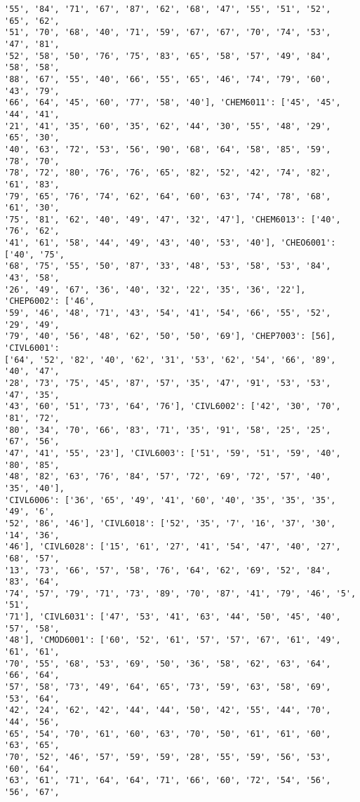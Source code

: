 \documentclass[11pt]{article}
\begin{document}
\begin{Verbatim}[commandchars=\\\{\}]
'55', '84', '71', '67', '87', '62', '68', '47', '55', '51', '52', '65', '62',
'51', '70', '68', '40', '71', '59', '67', '67', '70', '74', '53', '47', '81',
'52', '58', '50', '76', '75', '83', '65', '58', '57', '49', '84', '58', '58',
'88', '67', '55', '40', '66', '55', '65', '46', '74', '79', '60', '43', '79',
'66', '64', '45', '60', '77', '58', '40'], 'CHEM6011': ['45', '45', '44', '41',
'21', '41', '35', '60', '35', '62', '44', '30', '55', '48', '29', '65', '30',
'40', '63', '72', '53', '56', '90', '68', '64', '58', '85', '59', '78', '70',
'78', '72', '80', '76', '76', '65', '82', '52', '42', '74', '82', '61', '83',
'79', '65', '76', '74', '62', '64', '60', '63', '74', '78', '68', '61', '30',
'75', '81', '62', '40', '49', '47', '32', '47'], 'CHEM6013': ['40', '76', '62',
'41', '61', '58', '44', '49', '43', '40', '53', '40'], 'CHEO6001': ['40', '75',
'68', '75', '55', '50', '87', '33', '48', '53', '58', '53', '84', '43', '58',
'26', '49', '67', '36', '40', '32', '22', '35', '36', '22'], 'CHEP6002': ['46',
'59', '46', '48', '71', '43', '54', '41', '54', '66', '55', '52', '29', '49',
'79', '40', '56', '48', '62', '50', '50', '69'], 'CHEP7003': [56], 'CIVL6001':
['64', '52', '82', '40', '62', '31', '53', '62', '54', '66', '89', '40', '47',
'28', '73', '75', '45', '87', '57', '35', '47', '91', '53', '53', '47', '35',
'43', '60', '51', '73', '64', '76'], 'CIVL6002': ['42', '30', '70', '81', '72',
'80', '34', '70', '66', '83', '71', '35', '91', '58', '25', '25', '67', '56',
'47', '41', '55', '23'], 'CIVL6003': ['51', '59', '51', '59', '40', '80', '85',
'48', '82', '63', '76', '84', '57', '72', '69', '72', '57', '40', '35', '40'],
'CIVL6006': ['36', '65', '49', '41', '60', '40', '35', '35', '35', '49', '6',
'52', '86', '46'], 'CIVL6018': ['52', '35', '7', '16', '37', '30', '14', '36',
'46'], 'CIVL6028': ['15', '61', '27', '41', '54', '47', '40', '27', '68', '57',
'13', '73', '66', '57', '58', '76', '64', '62', '69', '52', '84', '83', '64',
'74', '57', '79', '71', '73', '89', '70', '87', '41', '79', '46', '5', '51',
'71'], 'CIVL6031': ['47', '53', '41', '63', '44', '50', '45', '40', '57', '58',
'48'], 'CMOD6001': ['60', '52', '61', '57', '57', '67', '61', '49', '61', '61',
'70', '55', '68', '53', '69', '50', '36', '58', '62', '63', '64', '66', '64',
'57', '58', '73', '49', '64', '65', '73', '59', '63', '58', '69', '53', '64',
'42', '24', '62', '42', '44', '44', '50', '42', '55', '44', '70', '44', '56',
'65', '54', '70', '61', '60', '63', '70', '50', '61', '61', '60', '63', '65',
'70', '52', '46', '57', '59', '59', '28', '55', '59', '56', '53', '60', '64',
'63', '61', '71', '64', '64', '71', '66', '60', '72', '54', '56', '56', '67',

\end{Verbatim}
\end{document}

